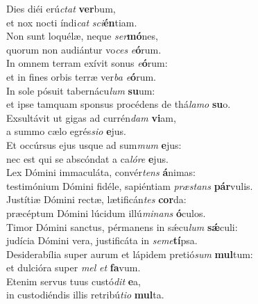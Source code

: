 \evenverse Dies diéi erú\textit{ctat} \textbf{ver}bum,~\*\\
\evenverse et nox nocti índi\textit{cat} \textit{sci}\textbf{én}tiam.\\
\oddverse Non sunt loquélæ, neque \textit{ser}\textbf{mó}nes,~\*\\
\oddverse quorum non audiántur vo\textit{ces} \textit{e}\textbf{ó}rum.\\
\evenverse In omnem terram exívit sonus \textit{e}\textbf{ó}rum:~\*\\
\evenverse et in fines orbis terræ ver\textit{ba} \textit{e}\textbf{ó}rum.\\
\oddverse In sole pósuit tabernácu\textit{lum} \textbf{su}um:~\*\\
\oddverse et ipse tamquam sponsus procédens de thá\textit{la}\textit{mo} \textbf{su}o.\\
\evenverse Exsultávit ut gigas ad currén\textit{dam} \textbf{vi}am,~\*\\
\evenverse a summo cælo egrés\textit{si}\textit{o} \textbf{e}jus.\\
\oddverse Et occúrsus ejus usque ad sum\textit{mum} \textbf{e}jus:~\*\\
\oddverse nec est qui se abscóndat a ca\textit{ló}\textit{re} \textbf{e}jus.\\
\evenverse Lex Dómini immaculáta, convér\textit{tens} \textbf{á}nimas:~\*\\
\evenverse testimónium Dómini fidéle, sapiéntiam \textit{præ}\textit{stans} \textbf{pár}vulis.\\
\oddverse Justítiæ Dómini rectæ, lætificán\textit{tes} \textbf{cor}da:~\*\\
\oddverse præcéptum Dómini lúcidum illú\textit{mi}\textit{nans} \textbf{ó}culos.\\
\evenverse Timor Dómini sanctus, pérmanens in sǽcu\textit{lum} \textbf{sǽ}culi:~\*\\
\evenverse judícia Dómini vera, justificáta in \textit{se}\textit{me}\textbf{tí}psa.\\
\oddverse Desiderabília super aurum et lápidem pretió\textit{sum} \textbf{mul}tum:~\*\\
\oddverse et dulcióra super \textit{mel} \textit{et} \textbf{fa}vum.\\
\evenverse Etenim servus tuus custó\textit{dit} \textbf{e}a,~\*\\
\evenverse in custodiéndis illis retribú\textit{ti}\textit{o} \textbf{mul}ta.\\
